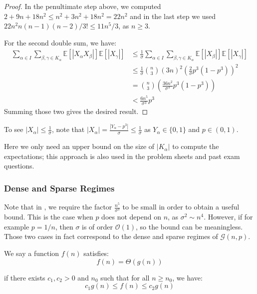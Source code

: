 \documentclass{article}
\begin{document}
\begin{proof}
    In the penultimate step above, we computed $2 + 9n + 18n^2 \leq n^2 + 3n^2 + 18n^2 = 22n^2$ and in the last step we used $22n^2 n(n-1)(n-2)/3! \leq 11 n^5/3$, as $n\geq 3$.

    For the second double sum, we have:
    \begin{align*}
        \sum_{\alpha\in I}\sum_{\beta,\gamma\in K_{\alpha}}\mathbb{E}[|X_{\alpha}X_{\beta}|]\mathbb{E}[|X_{\gamma}|] &\leq \frac{1}{\sigma}  \sum_{\alpha\in I}\sum_{\beta,\gamma\in K_{\alpha}}\mathbb{E}[|X_{\beta}|] \mathbb{E}[|X_{\gamma}|] \\
        &\leq \frac{1}{\sigma} \binom{n}{3} (3n)^2 \left(\frac{2}{\sigma}p^{3}(1-p^{3})\right)^2 \\
        &=\binom{n}{3} \left(\frac{36n^2}{\sigma^3}p^{3}(1-p^{3})\right) \\
        &< \frac{6n^5}{\sigma^3} p^3
    \end{align*}
    Summing those two gives the desired result.
\end{proof}

\begin{remark}
    To see $|X_\alpha| \leq \frac{1}{\sigma}$, note that $|X_\alpha| = \frac{|Y_\alpha - p^3|}{\sigma} \leq \frac{1}{\sigma}$ as $Y_\alpha \in \{0,1\}$ and $p\in (0,1)$.
\end{remark}

\begin{remark}
    Here we only need an upper bound on the size of $|K_\alpha|$ to compute the expectations; this approach is also used in the problem sheets and past exam questions.  
\end{remark}

\subsubsection{Dense and Sparse Regimes}  

Note that in , we require the factor $\frac{n^5}{\sigma^3}$ to be small in order to obtain a useful bound. This is the case when $p$ does not depend on $n$, as $\sigma^2 \sim n^4$. However, if for example $p=1/n$, then $\sigma$ is of order $\mathcal{O}(1)$, so the bound can be meaningless.  Those two cases in fact correspond to the dense and sparse regimes of $\mathcal{G}(n,p)$.  

\begin{definition}
    We say a function $f(n)$ satisfies:
    \[
        f(n) = \Theta(g(n))
        \]

    if there exists $c_1, c_2 > 0$ and $n_0$ such that for all $n\geq n_0$, we have:
    \[
        c_1 g(n) \leq f(n) \leq c_2 g(n)
    \]
\end{definition}
\end{document}
